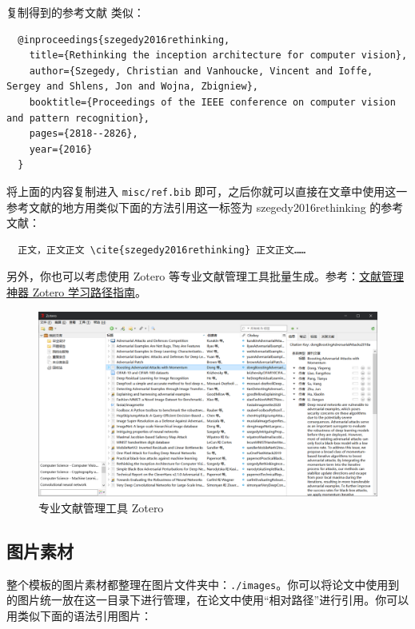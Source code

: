 复制得到的参考文献  类似：

\begin{verbatim}
  @inproceedings{szegedy2016rethinking,
    title={Rethinking the inception architecture for computer vision},
    author={Szegedy, Christian and Vanhoucke, Vincent and Ioffe, Sergey and Shlens, Jon and Wojna, Zbigniew},
    booktitle={Proceedings of the IEEE conference on computer vision and pattern recognition},
    pages={2818--2826},
    year={2016}
  }
\end{verbatim}

将上面的内容复制进入 \texttt{misc/ref.bib} 即可，之后你就可以直接在文章中使用这一参考文献的地方用类似下面的方法引用这一标签为 szegedy2016rethinking 的参考文献：

\begin{verbatim}
  正文，正文正文 \cite{szegedy2016rethinking} 正文正文……
\end{verbatim}

另外，你也可以考虑使用 Zotero 等专业文献管理工具批量生成。参考：\href{https://sspai.com/post/56724}{文献管理神器 Zotero 学习路径指南}。

\begin{figure}[H]
  \center
  \includegraphics[width=\textwidth]{images/zotero.png}
  \caption{专业文献管理工具 Zotero}
\end{figure}

\subsection{图片素材}

整个模板的图片素材都整理在图片文件夹中：\texttt{./images}。你可以将论文中使用到的图片统一放在这一目录下进行管理，在论文中使用“相对路径”进行引用。你可以用类似下面的语法引用图片：

